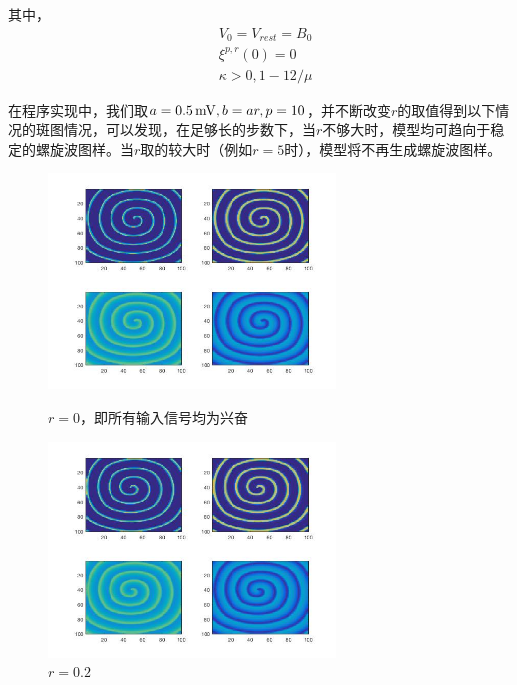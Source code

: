\documentclass[
bachelor,
nofont, %
pdflinks,
]{xjtuthesis}
\begin{document}
其中，
\begin{align*}
&V_0 = V_{rest} = B_0\\
&\xi^{p,r}(0) = 0\\
&\kappa > {0, 1-12/ \mu}
\end{align*}

在程序实现中，我们取$a=0.5\,\mathrm{mV}, b=ar, p=10$，并不断改变$r$的取值得到以下情况的斑图情况，可以发现，在足够长的步数下，当$r$不够大时，模型均可趋向于稳定的螺旋波图样。当$r$取的较大时（例如$r=5$时），模型将不再生成螺旋波图样。

\clearpage

\begin{figure}[!ht]
\begin{minipage}[!ht]{0.5\linewidth}
\centering
\includegraphics[width=3.0in]{p10r0_1.jpg}
\caption{$r=0$，即所有输入信号均为兴奋}
\end{minipage}%
\begin{minipage}[!ht]{0.5\linewidth}
\centering
\includegraphics[width=3.0in]{p10r0_2_1.jpg}
\caption{$r=0.2$}
\end{minipage}
\end{figure}
\end{document}
